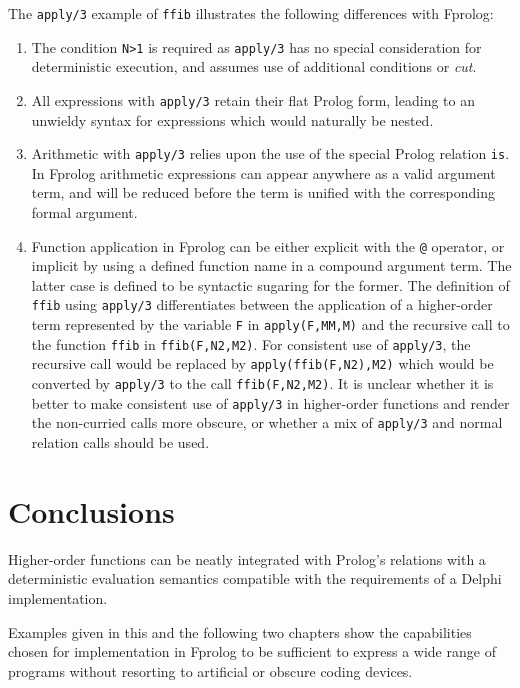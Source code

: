\documentclass[a4paper,11pt,twoside]{article}
\begin{document}
\begin{enumerate}
{  The \texttt{apply/3} example
  of \texttt{ffib} illustrates the following differences with Fprolog:
  \begin{enumerate}
  \item{The condition \texttt{N>1} is required as \texttt{apply/3} has no
    special consideration for deterministic execution, and assumes use of 
    additional conditions or \textit{cut}.}
  \item{All expressions with \texttt{apply/3} retain their flat Prolog form,
    leading to an unwieldy syntax for expressions which would naturally be
    nested.}
  \item{Arithmetic with \texttt{apply/3} relies upon the use of the special
    Prolog relation \texttt{is}.  In Fprolog arithmetic expressions can appear
    anywhere as a valid argument term, and will be reduced before the term
    is unified with the corresponding formal argument.}
  \item{Function application in Fprolog can be either explicit with the
    \texttt{@} operator, or implicit by using a defined function name in
    a compound argument term.  The latter case is defined to be syntactic
    sugaring for the former.  The definition of \texttt{ffib} using 
    \texttt{apply/3} differentiates between the application of a higher-order
    term represented by the variable \texttt{F} in \texttt{apply(F,MM,M)} and
    the recursive call to the function \texttt{ffib} in \texttt{ffib(F,N2,M2)}.
    For consistent use of \texttt{apply/3}, the recursive call would be
    replaced by \texttt{apply(ffib(F,N2),M2)} which would be converted by
    \texttt{apply/3} to the call \texttt{ffib(F,N2,M2)}.  It is unclear whether
    it is better to make consistent use of \texttt{apply/3} in higher-order
    functions and render the non-curried calls more obscure, or whether a mix
    of \texttt{apply/3} and normal relation calls should be used.}
  \end{enumerate}}
\end{enumerate}

\section{Conclusions} %

Higher-order functions can be neatly integrated with Prolog's relations
with a deterministic evaluation semantics compatible with the requirements
of a Delphi implementation.

Examples given in this and the following two chapters show the capabilities
chosen for implementation in Fprolog to be sufficient to express a wide range
of programs without resorting to artificial or obscure coding devices.
\end{document}
